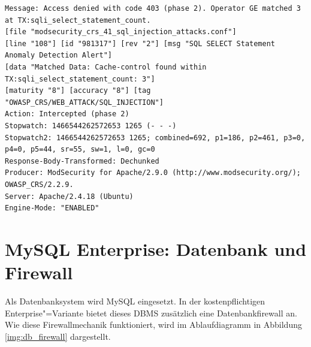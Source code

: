 \begin{listing}[ht!]

\begin{verbatim}
Message: Access denied with code 403 (phase 2). Operator GE matched 3 at TX:sqli_select_statement_count.
[file "modsecurity_crs_41_sql_injection_attacks.conf"]
[line "108"] [id "981317"] [rev "2"] [msg "SQL SELECT Statement Anomaly Detection Alert"]
[data "Matched Data: Cache-control found within TX:sqli_select_statement_count: 3"]
[maturity "8"] [accuracy "8"] [tag "OWASP_CRS/WEB_ATTACK/SQL_INJECTION"]
Action: Intercepted (phase 2)
Stopwatch: 1466544262572653 1265 (- - -)
Stopwatch2: 1466544262572653 1265; combined=692, p1=186, p2=461, p3=0, p4=0, p5=44, sr=55, sw=1, l=0, gc=0
Response-Body-Transformed: Dechunked
Producer: ModSecurity for Apache/2.9.0 (http://www.modsecurity.org/); OWASP_CRS/2.2.9.
Server: Apache/2.4.18 (Ubuntu)
Engine-Mode: "ENABLED"
\end{verbatim}
\end{listing}



\section{MySQL Enterprise: Datenbank und Firewall}

Als Datenbanksystem wird MySQL eingesetzt. In der kostenpflichtigen Enterprise"=Variante bietet dieses DBMS zusätzlich eine Datenbankfirewall an. Wie diese Firewallmechanik funktioniert, wird im Ablaufdiagramm in Abbildung \ref{img:db_firewall} dargestellt.

